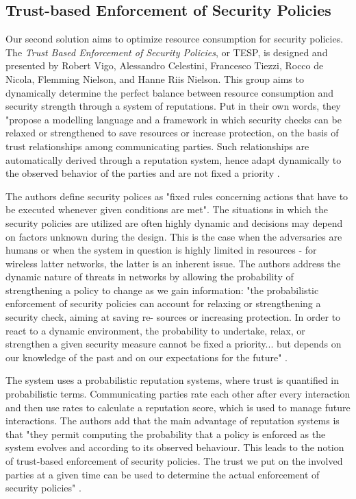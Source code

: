\documentclass[12pt,a4paper,twoside]{report}
\begin{document}
\subsection{Trust-based Enforcement of Security Policies}
Our second solution aims to optimize resource consumption for security policies. The \emph{Trust Based Enforcement of Security Policies}, or TESP, is designed and presented by Robert Vigo, Alessandro Celestini, Francesco Tiezzi, Rocco de Nicola, Flemming Nielson, and Hanne Riis Nielson\cite{vigo;etal:2014}. This group aims to dynamically determine the perfect balance between resource consumption and security strength through a system of reputations. Put in their own words, they "propose a modelling language and a framework in which security checks can be relaxed or strengthened to save resources or increase protection, on the basis of trust relationships among communicating parties. Such relationships are automatically derived through a reputation system, hence adapt dynamically to the observed behavior of the parties and are not fixed a priority \cite{vigo;etal:2014}.\par
The authors define security polices as "fixed rules concerning actions that have to be executed whenever given conditions are met". The situations in which the security policies are utilized are often highly dynamic and decisions may depend on factors unknown during the design. This is the case when the adversaries are humans or when the system in question is highly limited in resources - for wireless latter networks, the latter is an inherent issue. The authors address the dynamic nature of threats in networks by allowing the probability of strengthening a policy to change as we gain information: "the probabilistic enforcement of security policies can account for relaxing or strengthening a security check, aiming at saving re- sources or increasing protection. In order to react to a dynamic environment, the probability to undertake, relax, or strengthen a given security measure cannot be fixed a priority... but depends on our knowledge of the past and on our expectations for the future" \cite{vigo;etal:2014}.\par
The system uses a probabilistic reputation systems, where trust is quantified in probabilistic terms. Communicating parties rate each other after every interaction and then use rates to calculate a reputation score, which is used to manage future interactions. The authors add that the main advantage of reputation systems is that "they permit computing the probability that a policy is enforced as the system evolves and according to its observed behaviour. This leads to the notion of trust-based enforcement of security policies. The trust we put on the involved parties at a given time can be used to determine the actual enforcement of security policies" \cite{vigo;etal:2014}.\par
\end{document}
